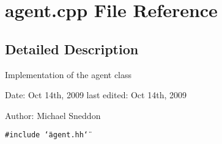 \section{agent.cpp File Reference}
\label{agent_8cpp}


\subsection{Detailed Description}
Implementation of the agent class

\begin{Desc}
\item[Date:]Oct 14th, 2009 last edited: Oct 14th, 2009\end{Desc}
\begin{Desc}
\item[Author:]Michael Sneddon \end{Desc}


{\tt \#include \char`\"{}agent.hh\char`\"{}}\par
